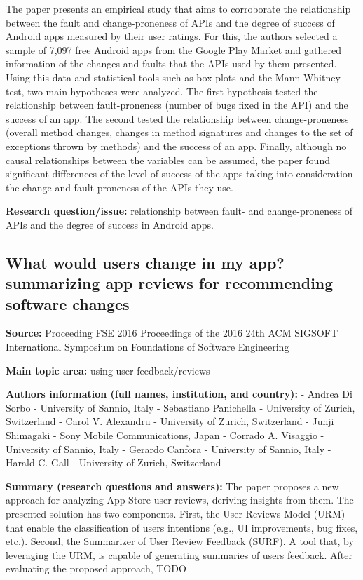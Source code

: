 \documentclass[]{book}
\begin{document}
The paper presents an empirical study that aims to corroborate the
relationship between the fault and change-proneness of APIs and the
degree of success of Android apps measured by their user ratings. For
this, the authors selected a sample of 7,097 free Android apps from the
Google Play Market and gathered information of the changes and faults
that the APIs used by them presented. Using this data and statistical
tools such as box-plots and the Mann-Whitney test, two main hypotheses
were analyzed. The first hypothesis tested the relationship between
fault-proneness (number of bugs fixed in the API) and the success of an
app. The second tested the relationship between change-proneness
(overall method changes, changes in method signatures and changes to the
set of exceptions thrown by methods) and the success of an app. Finally,
although no causal relationships between the variables can be assumed,
the paper found significant differences of the level of success of the
apps taking into consideration the change and fault-proneness of the
APIs they use.

\textbf{Research question/issue:} relationship between fault- and
change-proneness of APIs and the degree of success in Android apps.

\subsection{What would users change in my app? summarizing app reviews
for recommending software
changes}\label{what-would-users-change-in-my-app-summarizing-app-reviews-for-recommending-software-changes}

\textbf{Source:} Proceeding FSE 2016 Proceedings of the 2016 24th ACM
SIGSOFT International Symposium on Foundations of Software Engineering

\textbf{Main topic area:} using user feedback/reviews

\textbf{Authors information (full names, institution, and country):} -
Andrea Di Sorbo - University of Sannio, Italy - Sebastiano Panichella -
University of Zurich, Switzerland - Carol V. Alexandru - University of
Zurich, Switzerland - Junji Shimagaki - Sony Mobile Communications,
Japan - Corrado A. Visaggio - University of Sannio, Italy - Gerardo
Canfora - University of Sannio, Italy - Harald C. Gall - University of
Zurich, Switzerland

\textbf{Summary (research questions and answers):} The paper proposes a
new approach for analyzing App Store user reviews, deriving insights
from them. The presented solution has two components. First, the User
Reviews Model (URM) that enable the classification of users intentions
(e.g., UI improvements, bug fixes, etc.). Second, the Summarizer of User
Review Feedback (SURF). A tool that, by leveraging the URM, is capable
of generating summaries of users feedback. After evaluating the proposed
approach, TODO
\end{document}
